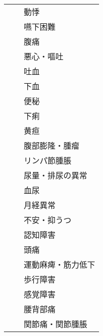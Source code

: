 \begin{xltabular}{\linewidth}{XXX}
 &  & 動悸 \\
 &  & 嚥下困難 \\
 &  & 腹痛 \\
 &  & 悪心・嘔吐 \\
 &  & 吐血 \\
 &  & 下血 \\
 &  & 便秘 \\
 &  & 下痢 \\
 &  & 黄疸 \\
 &  & 腹部膨隆・腫瘤 \\
 &  & リンパ節腫脹 \\
 &  & 尿量・排尿の異常 \\
 &  & 血尿 \\
 &  & 月経異常 \\
 &  & 不安・抑うつ \\
 &  & 認知障害 \\
 &  & 頭痛 \\
 &  & 運動麻痺・筋力低下 \\
 &  & 歩行障害 \\
 &  & 感覚障害 \\
 &  & 腰背部痛 \\
 &  & 関節痛・関節腫脹 \\
\bottomrule
\end{xltabular}


